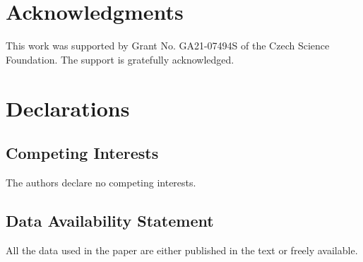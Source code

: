 \documentclass{article}              %
\begin{document}
\section*{Acknowledgments}

This work was supported by Grant No. GA21-07494S of the Czech Science Foundation. The support is gratefully acknowledged.

\section*{Declarations}

\subsection*{Competing Interests}

The authors declare no competing interests.

\subsection*{Data Availability Statement}

All the data used in the paper are either published in the text or freely available.




%
\end{document}
